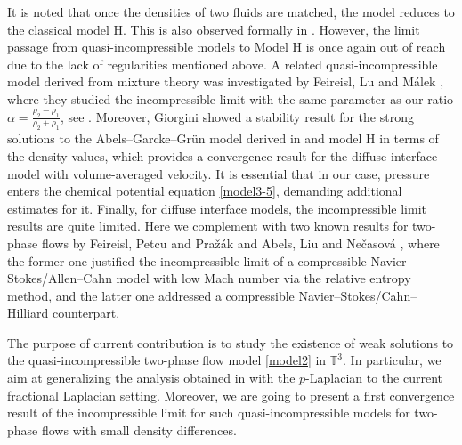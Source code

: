 \documentclass[reqno,a4paper,11pt]{amsart}
\theoremstyle{plain}
\numberwithin{equation}{section}
\newcommand{\bb}[1]{\mathbb{#1}}
\newcommand{\bbt}{\bb{T}}
\begin{document}
	It is noted that once the densities of two fluids are matched, the model reduces to the classical model H. This is also observed formally in \cite{AH}. However, the limit passage from quasi-incompressible models to Model H is once again out of reach due to the lack of regularities mentioned above. A related quasi-incompressible model derived from mixture theory was investigated by Feireisl, Lu and M\'alek \cite{FLM}, where they studied the incompressible limit with the same parameter as our ratio $\alpha = \frac{\rho_2 - \rho_1}{\rho_2 + \rho_1}$, see \cite[(2.13)]{FLM}. Moreover, Giorgini \cite{Giorgini2021} showed a stability result for the strong solutions to the Abels--Garcke--Gr\"un model derived in \cite{AGG2012} and model H \cite{HH} in terms of the density values, which provides a convergence result for the diffuse interface model with volume-averaged velocity. It is essential that in our case, pressure enters the chemical potential equation \eqref{model3-5}, demanding additional estimates for it. Finally, for diffuse interface models, the incompressible limit results are quite limited. Here we complement with two known results for two-phase flows by Feireisl, Petcu and Pra\v{z}\'ak \cite{FPP} and Abels, Liu and Ne\v{c}asov\'a \cite{ALN2024}, where the former one justified the incompressible limit of a compressible Navier--Stokes/Allen--Cahn model with low Mach number via the relative entropy method, and the latter one addressed a compressible Navier--Stokes/Cahn--Hilliard counterpart.
	
	The purpose of current contribution is to study the existence of weak solutions to the quasi-incompressible two-phase flow model \eqref{model2} in $\bbt^3$. In particular, we aim at generalizing the analysis obtained in \cite{AH} with the $p$-Laplacian to the current fractional Laplacian setting. Moreover, we are going to present a first convergence result of the incompressible limit for such quasi-incompressible models for two-phase flows with small density differences.
	
\end{document}
